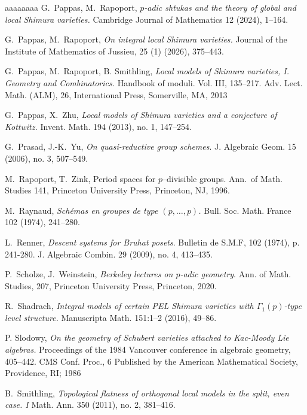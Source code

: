 \documentclass[reqno, 10pt]{amsart}
\theoremstyle{definition}
\numberwithin{equation}{subsection}
\numberwithin{subsubsection}{subsection}
\begin{document}
\begin{thebibliography}{aaaaaaaa}
   G.~Pappas, M.~Rapoport, \textit{$p$-adic shtukas and the theory of global and local Shimura varieties.} Cambridge Journal of Mathematics 12 (2024), 1--164.
  
  G.~Pappas, M.~Rapoport, \textit{On integral local Shimura varieties.} Journal of the Institute of Mathematics of Jussieu, 25 (1) (2026), 375--443.
 
   G.~Pappas, M.~Rapoport, B. Smithling, \emph{Local models of Shimura varieties, I. Geometry and Combinatorics.} Handbook of moduli. Vol. III, 135--217.
Adv. Lect. Math. (ALM), 26, International Press, Somerville, MA, 2013
 
    G.~Pappas, X.~Zhu, \emph{Local models of Shimura varieties and a conjecture of Kottwitz.}
Invent. Math. 194 (2013), no. 1, 147--254.

 G.~Prasad, J.-K.~Yu, \emph{On quasi-reductive group schemes}.
J. Algebraic Geom. 15 (2006), no. 3, 507--549.

  M.~Rapoport, T.~Zink,  {Period spaces for $p$--divisible groups}. Ann.\ of Math. Studies {141}, Princeton University Press, Princeton, NJ, 1996. 
 
  M.~Raynaud, \emph{Sch\'emas en groupes de type $(p,\ldots, p)$.} Bull. Soc. Math. France 102 (1974), 241--280.

 L.~Renner, \emph{Descent systems for Bruhat posets}. Bulletin de S.M.F, 102 (1974), p. 241-280.
J. Algebraic Combin. 29 (2009), no. 4, 413--435.



 P.~Scholze, J.~Weinstein, \emph{Berkeley lectures on $p$-adic geometry}. Ann. of Math. Studies, 207, Princeton University Press, Princeton, 2020. 

 R.~Shadrach, \emph{Integral models of certain PEL Shimura varieties with $\Gamma_1(p)$-type level structure.}  Manuscripta Math. 151:1--2 (2016), 49--86. 

  P. Slodowy,
\emph{On the geometry of Schubert varieties attached to Kac-Moody Lie algebras.} Proceedings of the 1984 Vancouver conference in algebraic geometry, 405--442.
CMS Conf. Proc., 6
Published by the American Mathematical Society, Providence, RI;  1986

 B.~Smithling,  \emph{Topological flatness of orthogonal local models in the split, even case. I}
Math. Ann. 350 (2011), no. 2, 381--416.


\end{thebibliography}
\end{document}
